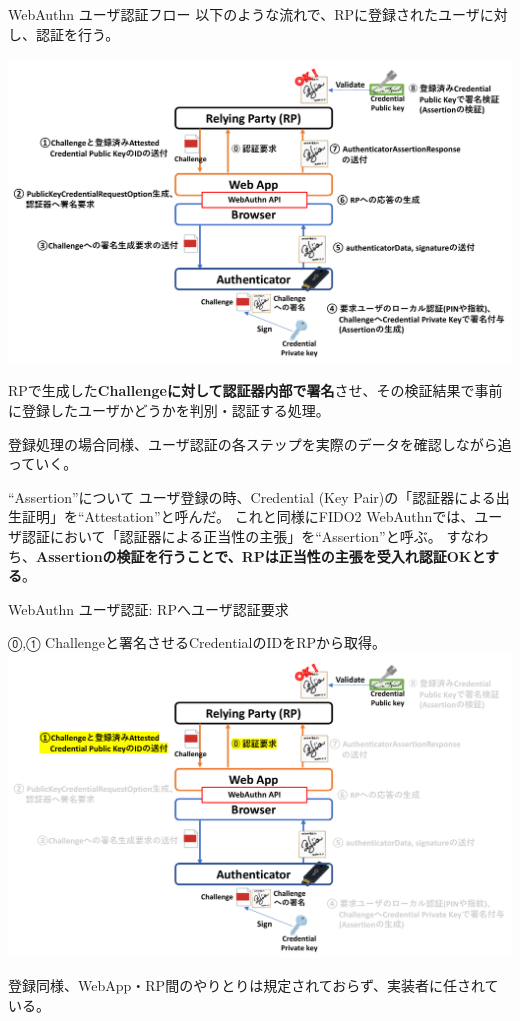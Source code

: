 \documentclass[12pt,dvipdfmx,uplatex]{beamer}
\begin{document}
\begin{frame}{WebAuthn ユーザ認証フロー}
以下のような流れで、RPに登録されたユーザに対し、認証を行う。
\begin{center}
\includegraphics[width=0.9\linewidth]{Figs/webauthn-authentication0.pdf}
\end{center}
RPで生成した\textbf{Challengeに対して認証器内部で署名}させ、その検証結果で事前に登録したユーザかどうかを判別・認証する処理。
\end{frame}

\begin{frame}
登録処理の場合同様、ユーザ認証の各ステップを実際のデータを確認しながら追っていく。

\begin{block}{\small ``Assertion''について}
ユーザ登録の時、Credential (Key Pair)の「認証器による出生証明」を``Attestation''と呼んだ。
これと同様に\alert{FIDO2 WebAuthnでは、ユーザ認証において「認証器による正当性の主張」を``Assertion''と呼ぶ}。
すなわち、\textbf{Assertionの検証を行うことで、RPは正当性の主張を受入れ認証OKとする}。
\end{block}
\end{frame}

\begin{frame}{WebAuthn ユーザ認証: RPへユーザ認証要求}
\begin{center}
⓪,① Challengeと署名させるCredentialのIDをRPから取得。
\includegraphics[width=0.9\linewidth]{Figs/webauthn-authentication1.pdf}
\end{center}
登録同様、WebApp・RP間のやりとりは規定されておらず、実装者に任されている。
\end{frame}
\end{document}
